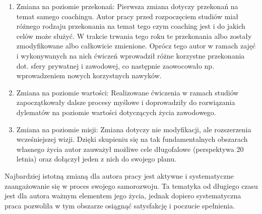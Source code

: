 \begin{enumerate}
  \item Zmiana na poziomie przekonań: Pierwsza zmiana dotyczy przekonań na temat samego coachingu. Autor pracy przed rozpoczęciem
      studiów miał różnego rodzaju przekonania na temat tego czym coaching jest i do jakich celów może służyć. W trakcie trwania
      tego roku te przekonania albo zostały zmodyfikowane albo całkowicie zmienione. Oprócz tego autor w ramach zajęć i wykonywanych
      na nich ćwiczeń wprowadził różne korzystne przekonania dot. sfery prywatnej i zawodowej, co następnie zaowocowało np. wprowadzeniem nowych
      korzystnych nawyków.

  \item Zmiana na poziomie wartości: Realizowane ćwiczenia w ramach studiów zapoczątkowały dalsze procesy myślowe i doprowadziły do
      rozwiązania dylematów na poziomie wartości dotyczących życia zawodowego.

  \item Zmiana na poziomie misji: Zmiana dotyczy nie modyfikacji, ale rozszerzenia wcześniejszej wizji. Dzięki skupieniu się na tak fundamentalnych
      obszarach własnego życia autor zauważył możliwe cele długofalowe (perspektywa 20 letnia) oraz dołączył jeden z nich do swojego planu.
\end{enumerate}

Najbardziej istotną zmianą dla autora pracy jest aktywne i systematyczne zaangażowanie się w proces swojego samorozwoju. Ta tematyka
od długiego czasu jest dla autora ważnym elementem jego życia, jednak dopiero systematyczna praca pozwoliła w tym obszarze osiągnąć
satysfakcję i poczucie spełnienia.
